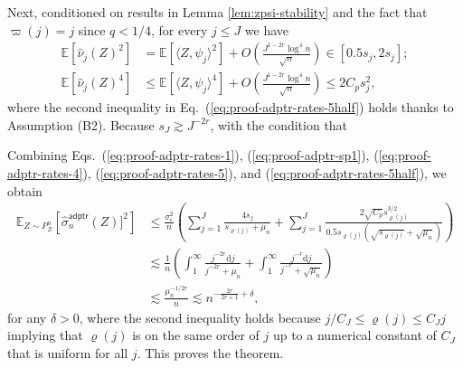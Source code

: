 \documentclass[11pt,a4paper]{article}
\renewcommand{\hat}{\widehat}
\theoremstyle{definition}
\theoremstyle{plain}
\theoremstyle{remark}
\newcommand{\ud}{\mathrm d}
\newcommand{\adptr}{\mathsf{adptr}}
\begin{document}
Next, conditioned on results in Lemma \ref{lem:zpsi-stability} and the fact that $\varpi(j)=j$ since $q<1/4$, for every $j\leq J$ we have
\begin{align}
\mathbb E[\hat\nu_j(Z)^2] &= \mathbb E[\langle Z,\psi_j\rangle^2] + O\left(\frac{J^{1-2r}\log^4 n}{\sqrt{n}}\right) \in [0.5s_j,2s_j];\label{eq:proof-adptr-rates-5}\\
\mathbb E[\hat\nu_j(Z)^4] &\leq \mathbb E[\langle Z,\psi_j\rangle^4] + O\left(\frac{J^{1-2r}\log^4 n}{\sqrt{n}}\right)\leq 2C_p s_j^2,\label{eq:proof-adptr-rates-5half}
\end{align}
where the second inequality in Eq.~(\ref{eq:proof-adptr-rates-5half}) holds thanks to Assumption (B2).
Because $s_J\gtrsim J^{-2r}$, with the condition that 

Combining Eqs.~(\ref{eq:proof-adptr-rates-1}), (\ref{eq:proof-adptr-sp1}), (\ref{eq:proof-adptr-rates-4}), (\ref{eq:proof-adptr-rates-5}), and (\ref{eq:proof-adptr-rates-5half}), we obtain
\begin{align*}
\mathbb E_{Z\sim P_Z^n}\left[\hat\sigma_n^\adptr(Z)]^2\right]
&\leq \frac{\sigma_\varepsilon^2}{n}\left(\sum_{j=1}^J\frac{4s_j}{s_{\varrho(j)}+\mu_n} + \sum_{j=1}^J\frac{2\sqrt{C_p}s_{\varrho(j)}^{3/2}}{0.5s_{\varrho(j)}(\sqrt{s_{\varrho(j)}}+\sqrt{\mu_n})}\right)\\
&\lesssim \frac{1}{n}\left(\int_1^{\infty}\frac{j^{-2r}\ud j}{j^{-2r}+\mu_n} + \int_1^{\infty}\frac{j^{-r}\ud j}{j^{-r}+\sqrt{\mu_n}}\right)\\
&\lesssim \frac{\mu_n^{-1/2r}}{n}\lesssim n^{-\frac{2r}{2r+1}+\delta},
\end{align*}
for any $\delta>0$, {\color{magenta}where the second inequality holds because $j/C_J\leq\varrho(j)\leq C_J j$ implying that $\varrho(j)$ is on the same order of $j$ up to a numerical constant of $C_J$
that is uniform for all $j$.}
This proves the theorem.




\end{document}
